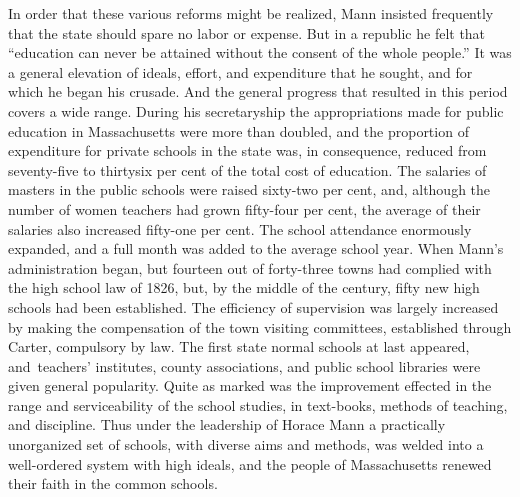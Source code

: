 \documentclass[]{book}
\begin{document}
In order that these various reforms might be realized, Mann insisted frequently that the state should spare no labor or expense. But in a republic he felt that ``education can never be attained without the consent of the whole people.'' It was a general elevation of ideals, effort, and expenditure that he sought, and for which he began his crusade. And the general progress that resulted in this period covers a wide range. During his secretaryship the appropriations made for public education in Massachusetts were more than doubled, and the proportion of expenditure for private schools in the state was, in consequence, reduced from seventy-five to thirtysix per cent of the total cost of education. The salaries of masters in the public schools were raised sixty-two per cent, and, although the number of women teachers had grown fifty-four per cent, the average of their salaries also increased fifty-one per cent. The school attendance enormously expanded, and a full month was added to the average school year. When Mann's administration began, but fourteen out of forty-three towns had complied with the high school law of 1826, but, by the middle of the century, fifty new high schools had been established. The efficiency of supervision was largely increased by making the compensation of the town visiting committees, established through Carter, compulsory by law. The first state normal schools at last appeared, and~teachers' institutes, county associations, and public school libraries were given general popularity. Quite as marked was the improvement effected in the range and serviceability of the school studies, in text-books, methods of teaching, and discipline. Thus under the leadership of Horace Mann a practically unorganized set of schools, with diverse aims and methods, was welded into a well-ordered system with high ideals, and the people of Massachusetts renewed their faith in the common schools.
\end{document}
